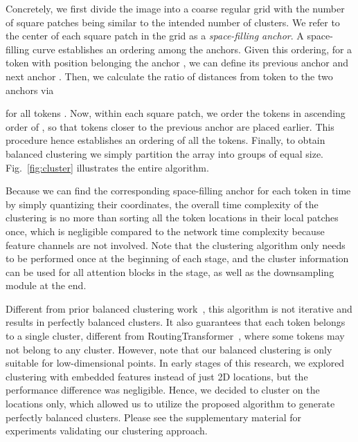 \documentclass[10pt,twocolumn,letterpaper]{article}
\begin{document}
Concretely, we first divide the image into a coarse regular grid with the number of square patches being similar to the intended number of clusters. We refer to the center of each square patch in the grid  as a \textit{space-filling anchor}. A space-filling curve establishes an ordering among the anchors. Given this ordering, for a token with position  belonging the anchor , we can define its previous anchor  and next anchor . 
Then, we calculate the ratio  of distances from token  to the two anchors via

for all tokens .
Now, within each square patch, we order the tokens in ascending order of , so that  tokens closer to the previous anchor are placed earlier. This procedure hence establishes an ordering of all the tokens. 
Finally, to obtain balanced clustering we simply partition the array into groups of equal size. Fig.~\ref{fig:cluster} illustrates the entire algorithm.


Because we can find the corresponding space-filling anchor for each token in  time by simply quantizing their coordinates, the overall time complexity of the clustering is no more than sorting all the token locations in their local patches once, which is negligible compared to the network time complexity because feature channels are not involved. Note that the clustering algorithm only needs to be performed once at the beginning of each stage, and the cluster information can be used for all attention blocks in the stage, as well as the downsampling module at the end.

Different from prior balanced clustering work~\cite{banerjee2006scalable}, this algorithm is not iterative and  results in perfectly balanced clusters. It also guarantees that each token belongs to a single cluster, different from RoutingTransformer~\cite{roy2021efficient}, where some tokens may not belong to any  cluster. However, note that our balanced clustering is only suitable for low-dimensional points. In early stages of this research, we explored clustering with embedded features instead of just 2D locations, but the performance difference was negligible. Hence, we decided to cluster on the locations only, which allowed us to utilize the proposed algorithm to generate perfectly balanced clusters. Please see the supplementary material for experiments validating our clustering approach.
\end{document}
